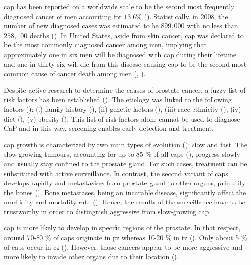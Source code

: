 \ac{cap} has been reported on a worldwide scale to be the second most frequently diagnosed cancer of men accounting for $13.6 \%$ (\cite{Ferlay2010}). Statistically, in 2008, the number of new diagnosed cases was estimated to be $899,000$ with no less than $258,100$ deaths (\cite{Ferlay2010}). In United States, aside from skin cancer, \ac{cap} was declared to be the most commonly diagnosed cancer among men, implying that approximately one in six men will be diagnosed with \ac{cap} during their lifetime and one in thirty-six will die from this disease causing \ac{cap} to be the second most common cause of cancer death among men (\cite{Siegel2013}, \cite{Society2013}).

Despite active research to determine the causes of prostate cancer, a fuzzy list of risk factors has been established (\cite{Society2010}). The etiology was linked to the following factors (\cite{Society2010}): (i) family history (\cite{Giovannucci2007,Steinberg1990}), (ii) genetic factors (\cite{Freedman2006,Amundadottir2006,Agalliu2009}), (iii) race-ethnicity (\cite{Giovannucci2007,Hoffman2001}), (iv) diet (\cite{Giovannucci2007,Ma2009,Alexander2010}), (v) obesity (\cite{Giovannucci2007,Rodriguez2007}). This list of risk factors alone cannot be used to diagnose CaP and in this way, screening enables early detection and treatment.

\ac{cap} growth is characterized by two main types of evolution (\cite{Strum2005}): slow and fast. The slow-growing tumours, accounting for up to 85 \% of all \acp{cap} (\cite{Lu-Yao2009}), progress slowly and usually stay confined to the prostate gland. For such cases, treatment can be substituted with active surveillance. In contrast, the second variant of \acp{cap} develops rapidly and metastasises from prostate gland to other organs, primarily the bones (\cite{Oster2013}). Bone metastases, being an incurable disease, significantly affect the morbidity and mortality rate (\cite{Ye2007}). Hence, the  results of the surveillance have to be trustworthy in order to distinguish aggressive from slow-growing \ac{cap}.

\ac{cap} is more likely to develop in specific regions of the prostate. In that respect, around 70-80 \% of \acp{cap} originate in \ac{pz} whereas 10-20 \% in \ac{tz} (\cite{Carrol1987,McNeal1988,Stamey1998}). Only about 5 \% of \acp{cap} occur in \ac{cz} (\cite{McNeal1988,Cohen2008}). However, those cancers appear to be more aggressive and more likely to invade other organs due to their location (\cite{Cohen2008}).


